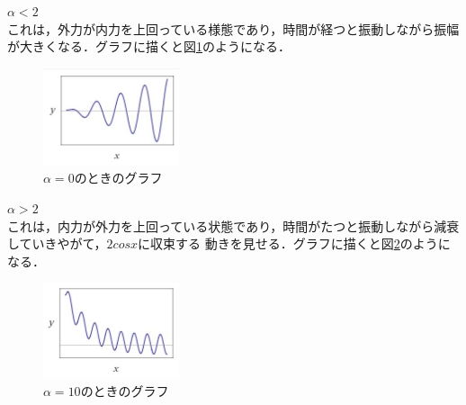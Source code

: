 \documentclass[a4paper,11pt]{bxjsarticle}
\begin{document}
\underline{$\alpha <2$}\\
これは，外力が内力を上回っている様態であり，時間が経つと振動しながら振幅が大きくなる．グラフに描くと図\ref{fig:0}のようになる．
\begin{figure}[htbp]
  \centering  %
  \includegraphics[clip,width = 4.0cm]{0.jpg}
  \caption{$\alpha=0$のときのグラフ}
  \label{fig:0}
  \end{figure}

\underline{$\alpha >2$}\\
これは，内力が外力を上回っている状態であり，時間がたつと振動しながら減衰していきやがて，$2cos x$に収束する
動きを見せる．グラフに描くと図\ref{fig:10}のようになる．
\begin{figure}[htbp]
  \centering  %
  \includegraphics[clip,width = 4.0cm]{10.jpg}
  \caption{$\alpha=10$のときのグラフ}
  \label{fig:10}
  \end{figure}
\end{document}

